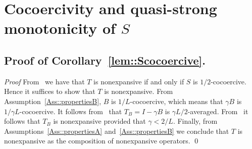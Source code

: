 \documentclass[envcountsect]{svjour3}
\begin{document}












\section{Cocoercivity and quasi-strong monotonicity of $S$}{\label{app::properties}}
\subsection*{Proof of Corollary~\ref{lem::Scocoercive}. }{\label{app::Scocoercive}}
{\it Proof}  From~\cite[Proposition~4.33]{book_comb} we have that $T$ is nonexpansive if and only if $S$ is $1/2$-cocoercive. Hence it suffices to show that $T$ is nonexpansive. From Assumption~\ref{Ass::propertiesB}, $B$ is $1/L$-cocoercive, which means that $\gamma B$ is $1/\gamma L$-cocoercive. It follows from~\cite[Lemma~5.1~(iv)]{PrecGFBS} that $T_B=I-\gamma B$ is $\gamma L/2$-averaged. From~\cite[Proposition~4.25~(i)]{book_comb} it follows that $T_B$ is nonexpansive provided that $\gamma<2/L$. Finally, from Assumptions~\ref{Ass::propertiesA} and~\ref{Ass::propertiesB} we conclude that $T$ is nonexpansive as the composition of nonexpansive operators.
\qed
\end{document}
